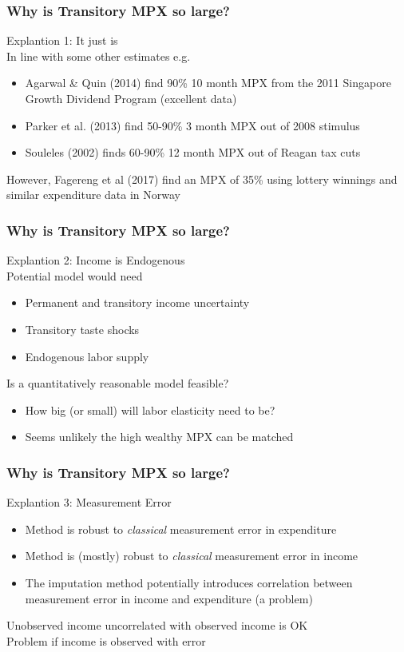 \documentclass{beamer}
\begin{document}
\frame
{
	\frametitle{Why is Transitory MPX so large?}
	Explantion 1: It just is \\
	\bigskip
	In line with some other estimates e.g.
	\begin{itemize}
		\item Agarwal \& Quin (2014) find 90\% 10 month MPX from the 2011 Singapore Growth Dividend Program (excellent data)
		\item Parker et al. (2013) find 50-90\% 3 month MPX out of 2008 stimulus
		\item Souleles (2002) finds 60-90\% 12 month MPX out of Reagan tax cuts
	\end{itemize}
	\pause
	However, Fagereng et al (2017) find an MPX of 35\% using lottery winnings and similar expenditure data in Norway

}
\frame
{
	\frametitle{Why is Transitory MPX so large?}
	Explantion 2: Income is Endogenous\\
	\bigskip
	Potential model would need
	\begin{itemize}
		\item Permanent and transitory income uncertainty
		\item Transitory taste shocks
		\item Endogenous labor supply
	\end{itemize}
	Is a quantitatively reasonable model feasible?
	\begin{itemize}
	\item How big (or small) will labor elasticity need to be?
	\item Seems unlikely the high wealthy MPX can be matched
\end{itemize}
}
\frame
{
	\frametitle{Why is Transitory MPX so large?}
	Explantion 3: Measurement Error\\
	\bigskip
	\begin{itemize}
		\item Method is robust to \textit{classical} measurement error in expenditure
		\item Method is (mostly) robust to \textit{classical} measurement error in income
		\item The imputation method potentially introduces correlation between measurement error in income and expenditure (a problem)
	\end{itemize}
	Unobserved income uncorrelated with observed income is OK\\
	Problem if income is observed with error
}
\end{document}
